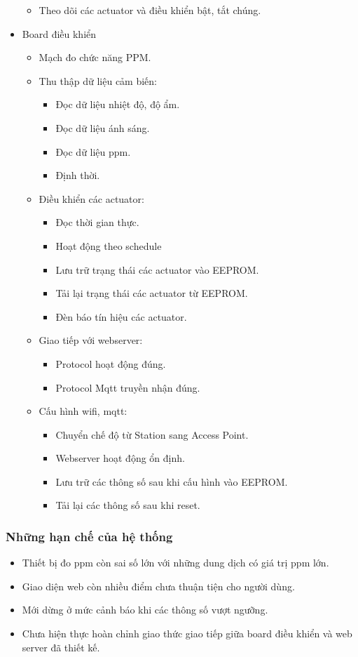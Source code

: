 \documentclass[a4paper,12pt,oneside]{article}
\begin{document}
\begin{itemize}
\begin{itemize}
			\item Theo dõi các actuator và điều khiển bật, tắt chúng. 
		\end{itemize}
	\item Board điều khiển
	\begin{itemize}
	\item Mạch đo chức năng PPM.
	\item Thu thập dữ liệu cảm biến:
	\begin{itemize}
	\item Đọc dữ liệu nhiệt độ, độ ẩm.
	\item Đọc dữ liệu ánh sáng.
	\item Đọc dữ liệu ppm.
	\item Định thời.
	\end{itemize}
	\item Điều khiển các actuator:
	\begin{itemize}
	\item Đọc thời gian thực.
	\item Hoạt động theo schedule
	\item Lưu trữ trạng thái các actuator vào EEPROM.
	\item Tải lại trạng thái các actuator từ EEPROM.
	\item Đèn báo tín hiệu các actuator.
	\end{itemize}
	\item Giao tiếp với webserver:
	\begin{itemize}
	\item Protocol hoạt động đúng.
	\item Protocol Mqtt truyền nhận đúng.
	\end{itemize}
	\item Cấu hình wifi, mqtt:
	\begin{itemize}
	\item Chuyển chế độ từ Station sang Access Point.
	\item Webserver hoạt động ổn định.
	\item Lưu trữ các thông số sau khi cấu hình vào EEPROM.
	\item Tải lại các thông số sau khi reset.
	\end{itemize}
	\end{itemize}
	\end{itemize}
	
	\subsubsection{Những hạn chế của hệ thống}
	\begin{itemize}
	\item Thiết bị đo ppm còn sai số lớn với những dung dịch có giá trị ppm lớn.
	\item Giao diện web còn nhiều điểm chưa thuận tiện cho người dùng.
	\item Mới dừng ở mức cảnh báo khi các thông số vượt ngưỡng.
	\item Chưa hiện thực hoàn chỉnh giao thức giao tiếp giữa board điều khiển và web server đã thiết kế.
	\end{itemize}		
	
\end{document}
